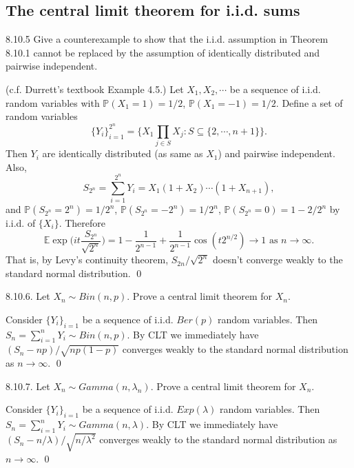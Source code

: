 \subsection{The central limit theorem for i.i.d. sums}
\begin{exercise}8.10.5  Give a counterexample to show that the i.i.d. assumption in Theorem 8.10.1 cannot be replaced by the assumption of identically distributed and pairwise independent.
\end{exercise}
\begin{answer} (c.f. Durrett's textbook Example 4.5.) Let $X_1,X_2,\cdots$ be a sequence of i.i.d. random variables with $\mathbb{P}(X_1=1)=1/2$, $\mathbb{P}(X_1=-1)=1/2$. Define a set of random variables
\begin{equation*}
    \{Y_i\}_{i=1}^{2^n}=\Big\{X_1\prod_{j\in S}X_j:S\subseteq\{2,\cdots,n+1\}\Big\}.
\end{equation*}
Then $Y_i$ are identically distributed (as same as $X_1$) and pairwise independent. Also,
\begin{equation*}
S_{2^n}=\sum_{i=1}^{2^n}Y_i=X_1(1+X_2)\cdots(1+X_{n+1}),
\end{equation*}
and $\mathbb{P}(S_{2^n}=2^n)=1/2^n$, $\mathbb{P}(S_{2^n}=-2^n)=1/2^n$, $\mathbb{P}(S_{2^n}=0)=1-2/2^n$ by i.i.d. of $\{X_i\}$. Therefore
\begin{equation*}
    \mathbb{E}\exp\Big(it\frac{S_{2^n}}{\sqrt{2^n}}\Big)=1-\frac{1}{2^{n-1}}+\frac{1}{2^{n-1}}\cos(t2^{n/2})\rightarrow 1 \text{ as }n\rightarrow\infty.
\end{equation*}
That is, by Levy's continuity theorem, $S_{2n}/\sqrt{2^n}$ doesn't converge weakly to the standard normal distribution.
\qed\qquad
\end{answer}

\begin{exercise}8.10.6. Let $X_n\sim Bin(n, p)$. Prove a central limit theorem for $X_n$.
\end{exercise}
\begin{answer}
Consider $\{Y_i\}_{i=1}$ be a sequence of i.i.d. $Ber(p)$ random variables. Then $S_n=\sum_{i=1}^nY_i\sim Bin(n,p)$. By CLT we immediately have $(S_n-np)/\sqrt{np(1-p)}$ converges weakly to the standard normal distribution as $n\rightarrow\infty$.
\qed \qquad
\end{answer}

\begin{exercise}8.10.7. Let $X_n\sim Gamma(n, \lambda_n)$. Prove a central limit theorem for $X_n$.
\end{exercise}
\begin{answer}
Consider $\{Y_i\}_{i=1}$ be a sequence of i.i.d. $Exp(\lambda)$ random variables. Then $S_n=\sum_{i=1}^nY_i\sim Gamma(n,\lambda)$. By CLT we immediately have $(S_n-n/\lambda)/\sqrt{n/\lambda^2}$ converges weakly to the standard normal distribution as $n\rightarrow\infty$.
\qed \qquad
\end{answer}

